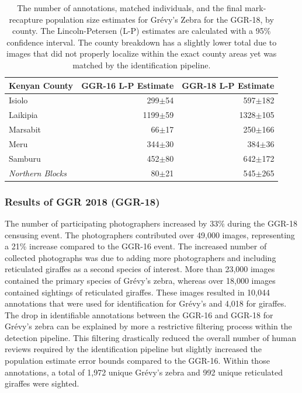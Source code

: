\begin{table}[!t]
    \caption{The number of annotations, matched individuals, and the final mark-recapture population size estimates for Gr\'evy's Zebra for the GGR-18, by county.  The Lincoln-Petersen (L-P) estimates are calculated with a 95\% confidence interval.  The county breakdown has a slightly lower total due to images that did not properly localize within the exact county areas yet was matched by the identification pipeline.}
    \label{table:stats-county}
    \begin{center}
        \begin{tabular}{| l | r | r |}
            \hline
            Kenyan County            & GGR-16 L-P Estimate & GGR-18 L-P Estimate \\
            \hline
            Isiolo                   & 299$\pm$54          & 597$\pm$182         \\
            \hline
            Laikipia                 & 1199$\pm$59         & 1328$\pm$105        \\
            \hline
            Marsabit                 & 66$\pm$17           & 250$\pm$166         \\
            \hline
            Meru                     & 344$\pm$30          & 384$\pm$36          \\
            \hline
            Samburu                  & 452$\pm$80          & 642$\pm$172         \\
            \hline
            \hline
            \textit{Northern Blocks} & 80$\pm$21           & 545$\pm$265         \\
            \hline
        \end{tabular}
    \end{center}
\end{table}

\subsubsection{Results of GGR 2018 (GGR-18)} \label{sec:ggr-results}

The number of participating photographers increased by 33\% during the GGR-18 censusing event.  The photographers contributed over 49,000 images, representing a 21\% increase compared to the GGR-16 event.  The increased number of collected photographs was due to adding more photographers and including reticulated giraffes as a second species of interest.  More than 23,000 images contained the primary species of Gr\'evy's zebra, whereas over 18,000 images contained sightings of reticulated giraffes.  These images resulted in 10,044 annotations that were used for identification for Gr\'evy's and 4,018 for giraffes.  The drop in identifiable annotations between the GGR-16 and GGR-18 for Gr\'evy's zebra can be explained by more a restrictive filtering process within the detection pipeline.  This filtering drastically reduced the overall number of human reviews required by the identification pipeline but slightly increased the population estimate error bounds compared to the GGR-16.  Within those annotations, a total of 1,972 unique Gr\'evy's zebra and 992 unique reticulated giraffes were sighted.

